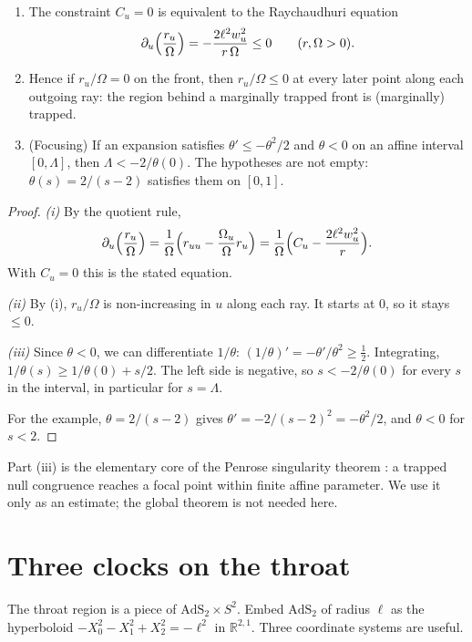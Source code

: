 \begin{theorem}\label{thm:wedge}\ver\
\begin{enumerate}[label=(\roman*)]
\item The constraint $C_u=0$ is equivalent to the Raychaudhuri equation
\[
\partial_u\Bigl(\frac{r_u}{\Omega}\Bigr)=-\frac{2\ell^2w_u^2}{r\,\Omega}\le0\qquad(r,\Omega>0).
\]
\item Hence if $r_u/\Omega=0$ on the front, then $r_u/\Omega\le0$ at every later point along each outgoing ray: the region behind a marginally trapped front is (marginally) trapped.
\item (Focusing) If an expansion satisfies $\theta'\le-\theta^2/2$ and $\theta<0$ on an affine interval $[0,\Lambda]$, then $\Lambda<-2/\theta(0)$. The hypotheses are not empty: $\theta(s)=2/(s-2)$ satisfies them on $[0,1]$.
\end{enumerate}
\end{theorem}
\begin{proof}
\emph{(i)} By the quotient rule,
\[
\partial_u\Bigl(\frac{r_u}\Omega\Bigr)=\frac1\Omega\Bigl(r_{uu}-\frac{\Omega_u}\Omega r_u\Bigr)=\frac1\Omega\Bigl(C_u-\frac{2\ell^2w_u^2}r\Bigr).
\]
With $C_u=0$ this is the stated equation.

\emph{(ii)} By (i), $r_u/\Omega$ is non-increasing in $u$ along each ray. It starts at $0$, so it stays $\le0$.

\emph{(iii)} Since $\theta<0$, we can differentiate $1/\theta$: $(1/\theta)'=-\theta'/\theta^2\ge\frac12$. Integrating, $1/\theta(s)\ge1/\theta(0)+s/2$. The left side is negative, so $s<-2/\theta(0)$ for every $s$ in the interval, in particular for $s=\Lambda$.

For the example, $\theta=2/(s-2)$ gives $\theta'=-2/(s-2)^2=-\theta^2/2$, and $\theta<0$ for $s<2$.
\end{proof}


Part (iii) is the elementary core of the Penrose singularity theorem \cite{Penrose1965,HawkingEllis}: a trapped null congruence reaches a focal point within finite affine parameter. We use it only as an estimate; the global theorem is not needed here.

\section{Three clocks on the throat}

The throat region is a piece of $\mathrm{AdS}_2\times S^2$. Embed $\mathrm{AdS}_2$ of radius $\ell$ as the hyperboloid $-X_0^2-X_1^2+X_2^2=-\ell^2$ in $\mathbb R^{2,1}$. Three coordinate systems are useful.

